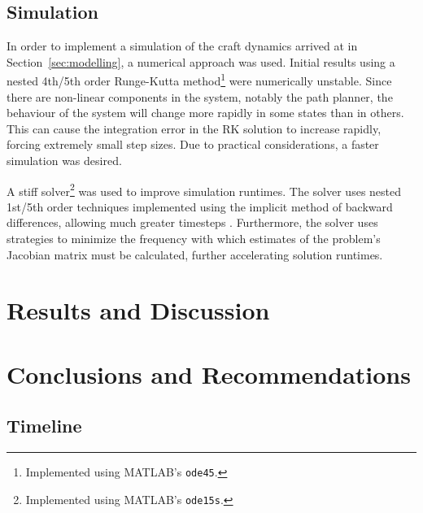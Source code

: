 \documentclass{sydeStyle}
\begin{document}
\section{Simulation}
In order to implement a simulation of the craft dynamics arrived at in
Section~\ref{sec:modelling}, a numerical approach was used.  Initial results
using a nested 4th/5th order Runge-Kutta method\footnote{Implemented using
MATLAB's \texttt{ode45}.} were numerically unstable.  Since there are non-linear
components in the system, notably the path planner, the behaviour of the system
will change more rapidly in some states than in others.  This can cause the
integration error in the RK solution to increase rapidly, forcing extremely
small step sizes.  Due to practical considerations, a faster simulation was
desired.

A stiff solver\footnote{Implemented using MATLAB's \texttt{ode15s}.} was used to
improve simulation runtimes.  The solver uses nested 1st/5th order techniques
implemented using the implicit method of backward differences, allowing much
greater timesteps \cite{SR97}.  Furthermore, the solver uses strategies to
minimize the frequency with which estimates of the problem's Jacobian matrix
must be calculated, further accelerating solution runtimes.

\chapter{Results and Discussion}

\chapter{Conclusions and Recommendations}

\appendix

\section{Timeline}
\end{document}
